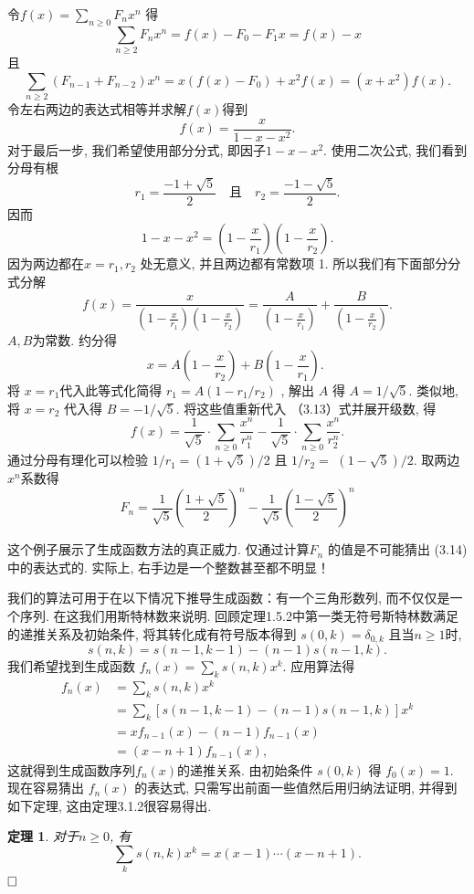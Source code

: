 \documentclass[a4paper,12pt]{ctexbook}
\newtheorem{theorem}[lemma]{\hspace{2em}定理}%
\begin{document}
令$f(x)=\sum_{n \geq 0} F_{n} x^{n}$ 得
$$
\sum_{n \geq 2} F_{n} x^{n}=f(x)-F_{0}-F_{1} x=f(x)-x
$$
且
$$
\sum_{n \geq 2}\left(F_{n-1}+F_{n-2}\right) x^{n}=x\left(f(x)-F_{0}\right)+x^{2} f(x)=\left(x+x^{2}\right) f(x) .
$$
令左右两边的表达式相等并求解$f(x)$得到
$$
f(x)=\frac{x}{1-x-x^{2}} .
$$对于最后一步, 我们希望使用部分分式, 即因子$1-x-x^{2}$.  使用二次公式, 我们看到分母有根
$$
r_{1}=\frac{-1+\sqrt{5}}{2} \quad \text {且} \quad r_{2}=\frac{-1-\sqrt{5}}{2}.
$$
因而
$$
1-x-x^{2}=\left(1-\frac{x}{r_{1}}\right)\left(1-\frac{x}{r_{2}}\right).
$$因为两边都在$x=r_{1}, r_{2}$ 处无意义, 并且两边都有常数项 1. 所以我们有下面部分分式分解
$$
f(x)=\frac{x}{\left(1-\frac{x}{r_{1}}\right)\left(1-\frac{x}{r_{2}}\right)}=\frac{A}{\left(1-\frac{x}{r_{1}}\right)}+\frac{B}{\left(1-\frac{x}{r_{2}}\right)}.
$$
$A, B$为常数. 约分得
$$
x=A\left(1-\frac{x}{r_{2}}\right)+B\left(1-\frac{x}{r_{1}}\right) \text {. }
$$
将 $x=r_{1}$代入此等式化简得  $r_{1}=A\left(1-r_{1} / r_{2}\right)$ , 解出 $A$ 得 $A=1 / \sqrt{5}$. 类似地, 将  $x=r_{2}$ 代入得 $B=-1 / \sqrt{5}$. 将这些值重新代入
（3.13）式并展开级数, 得
$$
f(x)=\frac{1}{\sqrt{5}} \cdot \sum_{n \geq 0} \frac{x^{n}}{r_{1}^{n}}-\frac{1}{\sqrt{5}} \cdot \sum_{n \geq 0} \frac{x^{n}}{r_{2}^{n}}.
$$通过分母有理化可以检验 $1 / r_{1}=(1+\sqrt{5}) / 2$ 且 $1 / r_{2}=$ $(1-\sqrt{5}) / 2$. 取两边 $x^{n}$系数得
\[
F_{n}=\frac{1}{\sqrt{5}}\left(\frac{1+\sqrt{5}}{2}\right)^{n}-\frac{1}{\sqrt{5}}\left(\frac{1-\sqrt{5}}{2}\right)^{n}\tag{3.14}
\]

这个例子展示了生成函数方法的真正威力. 仅通过计算$F_{n}$  的值是不可能猜出 (3.14) 中的表达式的. 实际上, 右手边是一个整数甚至都不明显！

我们的算法可用于在以下情况下推导生成函数：有一个三角形数列, 而不仅仅是一个序列. 在这我们用斯特林数来说明. 回顾定理1.5.2中第一类无符号斯特林数满足的递推关系及初始条件, 将其转化成有符号版本得到 $s(0, k)=\delta_{0, k}$ 且当$n \geq 1$时,
$$
s(n, k)=s(n-1, k-1)-(n-1) s(n-1, k).
$$
我们希望找到生成函数 $f_{n}(x)=\sum_{k} s(n, k) x^{k}$. 应用算法得
$$
\begin{aligned}
f_{n}(x) &=\sum_{k} s(n, k) x^{k} \\
&=\sum_{k}[s(n-1, k-1)-(n-1) s(n-1, k)] x^{k} \\
&=x f_{n-1}(x)-(n-1) f_{n-1}(x) \\
&=(x-n+1) f_{n-1}(x),
\end{aligned}
$$这就得到生成函数序列$f_{n}(x)$的递推关系. 由初始条件 $s(0, k)$ 得 $f_{0}(x)=1$. 现在容易猜出 $f_{n}(x)$ 的表达式, 只需写出前面一些值然后用归纳法证明, 并得到如下定理, 这由定理3.1.2很容易得出.
\begin{theorem}
	对于$n \geq 0$, 有$$
	\sum_{k} s(n, k) x^{k}=x(x-1) \cdots(x-n+1).
	$$ $\hfill\square$
\end{theorem}
\end{document}
